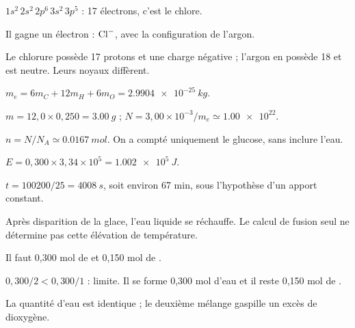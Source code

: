 \begin{questions}
\item $1s^2\,2s^2\,2p^6\,3s^2\,3p^5$ : 17 électrons, c’est le chlore.
\item Il gagne un électron : $\ce{Cl-}$, avec la configuration de l’argon.
\item Le chlorure possède 17 protons et une charge négative ; l’argon en possède 18 et est neutre. Leurs noyaux diffèrent.
\end{questions}

\begin{questions}
\item $m_e=6m_C+12m_H+6m_O=\qty{2,9904e-25}{kg}$.
\item $m=12,0\times0,250=\qty{3,00}{g}$ ; $N=3,00\times10^{-3}/m_e\simeq\num{1,00e22}$.
\item $n=N/N_A\simeq\qty{0,0167}{mol}$. On a compté uniquement le glucose, sans inclure l’eau.
\end{questions}

\begin{questions}
\item $E=0,300\times3,34\times10^5=\qty{1,002e5}{J}$.
\item $t=100200/25=\qty{4008}{s}$, soit environ 67 min, sous l’hypothèse d’un apport constant.
\item Après disparition de la glace, l’eau liquide se réchauffe. Le calcul de fusion seul ne détermine pas cette élévation de température.
\end{questions}

\begin{questions}
\item Il faut 0,300 mol de  et 0,150 mol de .
\item $0,300/2<0,300/1$ :  limite. Il se forme 0,300 mol d’eau et il reste 0,150 mol de .
\item La quantité d’eau est identique ; le deuxième mélange gaspille un excès de dioxygène.
\end{questions}

